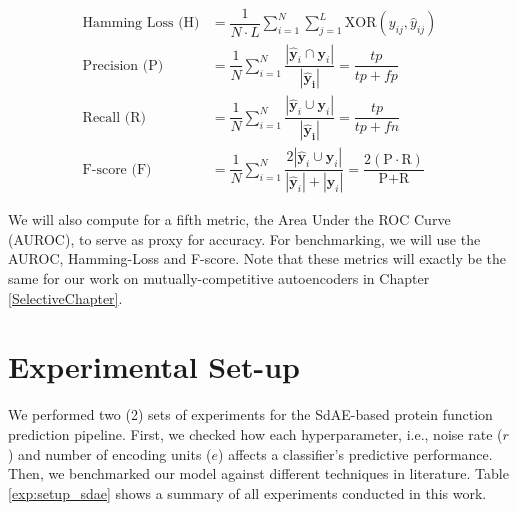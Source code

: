 \begin{align}
    \text{Hamming Loss (H)} &= \dfrac{1}{N \cdot L} \sum_{i=1}^{N} \sum_{j=1}^{L}
    \text{XOR}(y_{ij}, \widehat{y}_{ij}) \\
    \text{Precision (P)} &=
    \dfrac{1}{N}\sum_{i=1}^{N}\dfrac{|\mathbf{\widehat{y}}_{i} \cap
    \mathbf{y}_{i}|}{|\mathbf{\widehat{y}_{i}}|} = \dfrac{tp}{tp + fp} \\
    \text{Recall (R)} &=
    \dfrac{1}{N}\sum_{i=1}^{N}\dfrac{|\mathbf{\widehat{y}}_{i} \cup
    \mathbf{y}_{i}|}{|\mathbf{\widehat{y}_{i}}|} = \dfrac{tp}{tp + fn} \\
    \text{F-score (F)} &=
    \dfrac{1}{N}\sum_{i=1}^{N} \dfrac{2 | \mathbf{\widehat{y}}_{i} \cup
        \mathbf{y}_{i}|}{|\mathbf{\widehat{y}}_{i} | + |\mathbf{y}_{i}|} =
        \dfrac{2 (\text{P} \cdot \text{R})}{\text{P} +
        \text{R}}
\end{align}

\par We will also compute for a fifth metric, the Area Under the ROC Curve
(AUROC), to serve as proxy for accuracy. For benchmarking, we will use the AUROC,
Hamming-Loss and F-score. Note that these metrics will exactly be the same for
our work on mutually-competitive autoencoders in Chapter \ref{SelectiveChapter}.

\section{Experimental Set-up}
\label{SDSetup}

\par We performed two (2) sets of experiments for the SdAE-based protein
function prediction pipeline. First, we checked how each hyperparameter,
i.e., noise rate ($r$) and number of encoding units ($e$) affects a
classifier's predictive performance. Then, we benchmarked our model against
different techniques in literature. Table \ref{exp:setup_sdae}
shows a summary of all experiments conducted in this work.

